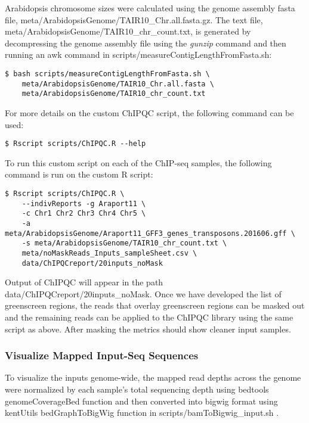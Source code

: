 \documentclass{article}
\begin{document}
\begin{sloppypar}
Arabidopsis chromosome sizes were calculated using the genome assembly fasta file,  {\selectfont meta/ArabidopsisGenome/TAIR10\_Chr.all.fasta.gz}. The text file, {\selectfont meta/ArabidopsisGenome/TAIR10\_chr\_count.txt}, is generated by decompressing the genome assembly file using the \emph{gunzip} command and then running an awk command in {\selectfont scripts/measureContigLengthFromFasta.sh}:

\begin{verbatim}
$ bash scripts/measureContigLengthFromFasta.sh \
    meta/ArabidopsisGenome/TAIR10_Chr.all.fasta \
    meta/ArabidopsisGenome/TAIR10_chr_count.txt
\end{verbatim}

For more details on the custom ChIPQC script, the following command can be used:
\begin{verbatim}
$ Rscript scripts/ChIPQC.R --help
\end{verbatim}

To run this custom script on each of the ChIP-seq samples, the following command is run on the custom R script:

\begin{verbatim}
$ Rscript scripts/ChIPQC.R \
    --indivReports -g Araport11 \
    -c Chr1 Chr2 Chr3 Chr4 Chr5 \
    -a meta/ArabidopsisGenome/Araport11_GFF3_genes_transposons.201606.gff \
    -s meta/ArabidopsisGenome/TAIR10_chr_count.txt \
    meta/noMaskReads_Inputs_sampleSheet.csv \
    data/ChIPQCreport/20inputs_noMask
\end{verbatim}

Output of ChIPQC will appear in the path {\selectfont data/ChIPQCreport/20inputs\_noMask}. Once we have developed the list of greenscreen regions, the reads that overlay greenscreen regions can be masked out and the remaining reads can be applied to the ChIPQC library using the same script as above. After masking the metrics should show cleaner input samples. 

\subsubsection{Visualize Mapped Input-Seq Sequences}
To visualize the inputs genome-wide, the mapped read depths across the genome were  normalized by each sample's total sequencing depth using bedtools genomeCoverageBed function and then converted into bigwig format using kentUtils bedGraphToBigWig function in {\selectfont scripts/bamToBigwig\_input.sh} \cite{kentUtils}.


\end{sloppypar}
\end{document}
